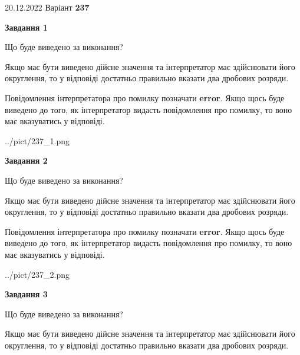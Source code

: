 \documentclass[12pt, ukrainian]{article}
\begin{document}
{20.12.2022 Варіант \No \textbf { 237 }\par}
{
\begin {Large}

{\begin {center}\textbf{Завдання 1}\end {center}}\par
Що буде виведено за виконання? \par

Якщо має бути виведено дійсне значення та інтерпретатор має здійснювати його округлення, 
то у відповіді достатньо правильно вказати два дробових розряди.

Повідомлення інтерпретатора про помилку позначати \textbf{error}.
Якщо щось буде виведено до того, як інтерпретатор видасть повідомлення про помилку, 
то воно має вказуватись у відповіді. \par

\begin{center}
	{../pict/237_1.png}
\end{center}
\newpage

{\begin {center}\textbf{Завдання 2}\end {center}}\par
Що буде виведено за виконання? \par

Якщо має бути виведено дійсне значення та інтерпретатор має здійснювати його округлення, 
то у відповіді достатньо правильно вказати два дробових розряди.

Повідомлення інтерпретатора про помилку позначати \textbf{error}.
Якщо щось буде виведено до того, як інтерпретатор видасть повідомлення про помилку, 
то воно має вказуватись у відповіді. \par

\begin{center}
	{../pict/237_2.png}
\end{center}
\newpage

{\begin {center}\textbf{Завдання 3}\end {center}}\par
Що буде виведено за виконання? \par

Якщо має бути виведено дійсне значення та інтерпретатор має здійснювати його округлення, 
то у відповіді достатньо правильно вказати два дробових розряди.


\end{Large}}
\end{document}
